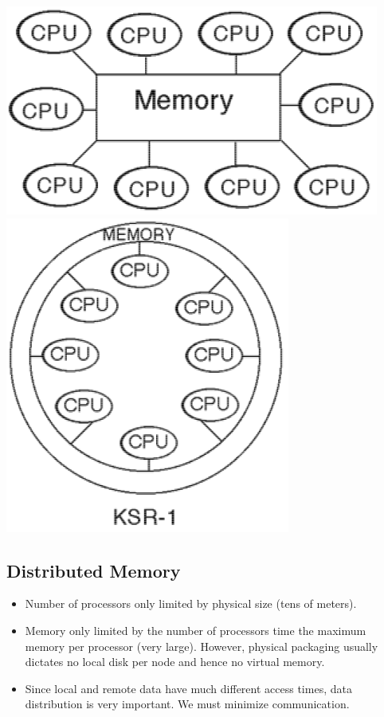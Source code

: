 \documentclass[12pt, a4paper]{book}
\begin{document}
\begin{minipage}{0.3\linewidth}
    \includegraphics[width=0.99\linewidth]{figures/shared-memory01.png}
    \includegraphics[width=0.99\linewidth]{figures/shared-memory02.png}
\end{minipage}

\subsection{Distributed Memory}
\begin{itemize}
    \item Number of processors only limited by physical size (tens of meters).
    \item Memory only limited by the number of processors time the maximum memory per processor (very large). However, physical packaging usually dictates no local disk per node and hence no virtual memory.
    \item Since local and remote data have much different access times, data distribution is very important. We must minimize communication.
\end{itemize}
\end{document}
